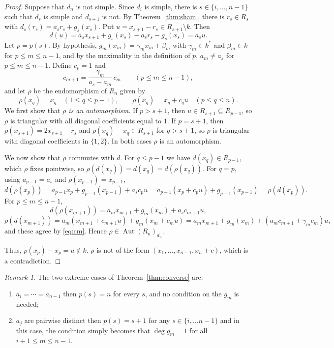\documentclass[11pt]{amsart}
\theoremstyle{definition}
\theoremstyle{remark}
\newtheorem{remark}[theorem]{Remark}
\numberwithin{equation}{theorem}
\newcommand{\Aut}{\operatorname{Aut}}
\begin{document}
\begin{proof}
Suppose that $d_n$ is not simple. Since $d_i$ is simple, there is $s\in\{i,\dots,n-1\}$ such that $d_s$ is
simple and $d_{s+1}$ is not. By Theorem~\ref{thm:sham}, there is $r_s\in R_s$ with
$d_s(r_s)=a_sr_s+g_s(x_s)$. Put $u=x_{s+1}-r_s\in R_{s+1}\setminus k$. Then
\[
d(u)=a_sx_{s+1}+g_s(x_s)-a_sr_s-g_s(x_s)=a_su .
\]
Let $p=p(s)$. By hypothesis, $g_m(x_m)=\gamma_mx_m+\beta_m$ with $\gamma_m\in k^*$ and $\beta_m \in k$ for $p\le m\le n-1$, and
by the maximality in the definition of $p$, $a_m\neq a_s$ for $p\le m\le n-1$. Define $c_p=1$ and
\begin{equation}\label{eq:cm}
c_{m+1}=\frac{\gamma_m}{a_s-a_m}\,c_m\qquad(p\le m\le n-1),
\end{equation}
and let $\rho$ be the endomorphism of $R_n$ given by
\[
\rho(x_q)=x_q\quad(1\le q\le p-1),\qquad \rho(x_q)=x_q+c_qu\quad(p\le q\le n).
\]
We first show that \emph{$\rho$ is an automorphism.} If $p>s+1$, then $u\in R_{s+1}\subseteq R_{p-1}$, so $\rho$ is triangular
with all diagonal coefficients equal to $1$. If $p=s+1$, then $\rho(x_{s+1})=2x_{s+1}-r_s$ and
$\rho(x_q)-x_q\in R_{s+1}$ for $q>s+1$, so $\rho$ is triangular with diagonal coefficients in $\{1,2\}$.
In both cases $\rho$ is an automorphism.

We now show that $\rho$ commutes with $d$. For $q\le p-1$ we have $d(x_q)\in R_{p-1}$, which $\rho$ fixes pointwise,
so $\rho(d(x_q))=d(x_q)=d(\rho(x_q))$. For $q=p$, using $a_{p-1}=a_s$ and $\rho(x_{p-1})=x_{p-1}$,
\[
d(\rho(x_p))=a_{p-1}x_p+g_{p-1}(x_{p-1})+a_sc_pu=a_{p-1}(x_p+c_pu)+g_{p-1}(x_{p-1})=\rho(d(x_p)).
\]
For $p\le m\le n-1$,
\[
d(\rho(x_{m+1}))=a_mx_{m+1}+g_m(x_m)+a_sc_{m+1}u,
\]
\[
\rho(d(x_{m+1}))=a_m(x_{m+1}+c_{m+1}u)+g_m(x_m+c_mu)=a_mx_{m+1}+g_m(x_m)+(a_mc_{m+1}+\gamma_mc_m)u,
\]
and these agree by \eqref{eq:cm}. Hence $\rho\in\Aut(R_n)_{d_n}$.

Thus, $\rho(x_p)-x_p=u\notin k$. %
$\rho$ is not of the form
$(x_1,\dots,x_{n-1},x_n+c)$, which is a contradiction.
\end{proof}

\begin{remark}
The two extreme cases of Theorem~\ref{thm:converse} are:
\begin{enumerate}[label=\textup{(\arabic*)}]
\item $a_i=\cdots=a_{n-1}$ then $p(s)=n$ for every $s$, and no condition on the $g_m$ is needed;
\item $a_j$ are pairwise distinct then $p(s)=s+1$ for any $s\in \{i,\ldots n-1\}$ and in this case, the condition simply becomes that $\deg g_m=1$ for all $i+1\le m\le n-1$.
\end{enumerate}
\end{remark}
\end{document}
